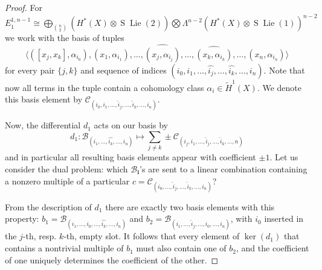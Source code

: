 \documentclass[12pt]{article}
\DeclareMathOperator{\Lie}{Lie}
\DeclareMathOperator{\Suspension}{S}
\theoremstyle{plain}
\theoremstyle{definition}
\theoremstyle{remark}
\begin{document}
\begin{proof}
    
    For $E_1^{1,n-1}
    \cong \bigoplus_{\binom{n}{2}}(H^*(X)\otimes \Suspension\Lie(2)) \bigotimes \Lambda^{n-2}\left( H^*(X)\otimes \Suspension\Lie(1) \right) ^{n-2}$ we work with the basis of tuples
    \begin{equation*}
        \langle([x_j, x_k], \alpha_{i_0}), (x_1, \alpha_{i_1}), \ldots, \widehat{(x_{j}, \alpha_{i_{j}})},\ldots, \widehat{(x_{k}, \alpha_{i_{k}})}, \ldots, (x_n, \alpha_{i_{n}})\rangle
    \end{equation*}
    for every pair $\{j,k\}$ and sequence of indices $(i_0,i_1,\ldots, \widehat{i_j},\ldots, \widehat{i_k},\ldots, i_n)$. Note that now all terms in the tuple contain a cohomology class $\alpha_i\in \tilde{H}^1(X)$. We denote this basis element by $\mathcal{C}_{(i_0,i_1,\ldots, \widehat{i}_j,\ldots, \widehat{i}_k,\ldots, i_n)}$.
    
    Now, the differential $d_1$ acts on our basis by
    \begin{equation}
        d_1: \mathcal{B}_{(i_1,\ldots, \widehat{i_k},\ldots, i_{n})} \longmapsto \sum_{j\neq k} \pm \mathcal{C}_{(i_j,i_1,\ldots, \widehat{i}_j,\ldots, \widehat{i}_k,\ldots, n)}
    \end{equation}
    and in particular all resulting basis elements appear with coefficient $\pm 1$. Let us consider the dual problem: which $\mathcal{B}_\mathbf{i}$'s are sent to a linear combination containing a nonzero multiple of a particular $c = \mathcal{C}_{(i_0,\ldots,\widehat{i}_j,\ldots,\widehat{i}_k,\ldots ,i_n)}$?
    
    From the description of $d_1$ there are exactly two basis elements with this property: $b_1 = \mathcal{B}_{(i_1,\ldots, i_0,\ldots,\widehat{i_k},\ldots, i_n)}$ and $b_2 = \mathcal{B}_{(i_1,\ldots, \widehat{i}_j,\ldots,i_0,\ldots, i_n)}$, with $i_0$ inserted in the $j$-th, resp. $k$-th, empty slot. It follows that every element of $\ker(d_1)$ that contains a nontrivial multiple of $b_1$ must also contain one of $b_2$, and the coefficient of one uniquely determines the coefficient of the other.
    

\end{proof}
\end{document}
